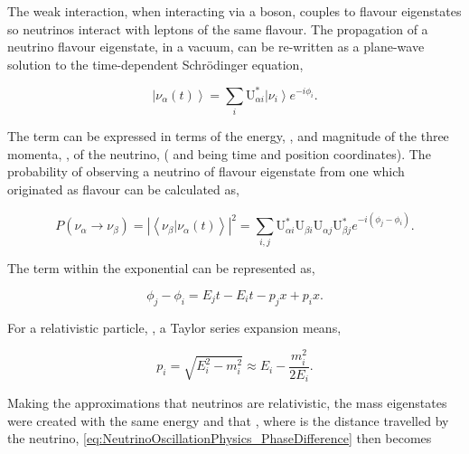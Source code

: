 The weak interaction, when interacting via a  boson, couples to flavour eigenstates so neutrinos interact with leptons of the same flavour. The propagation of a neutrino flavour eigenstate, in a vacuum, can be re-written as a plane-wave solution to the time-dependent Schr{\"o}dinger equation,

\begin{equation}
  \label{eq:NeutrinoOscillationPhysics_TimeDepSuperposition}
  \left|\nu_{\alpha}(t)\right> = \sum_{i}\mathrm{U}^{*}_{\alpha i}\left|\nu_{i}\right>e^{-i \phi_{i}}.
\end{equation}

The  term can be expressed in terms of the energy, , and magnitude of the three momenta, , of the neutrino,  ( and  being time and position coordinates). The probability of observing a neutrino of flavour eigenstate \quickmath{\beta} from one which originated as flavour \quickmath{\alpha} can be calculated as,

\begin{equation}
  \label{eq:NeutrinoOscillationPhysics_ProbabilityComplexForm}
  P(\nu_{\alpha} \rightarrow \nu_{\beta}) = \left| \left< \nu_{\beta} | \nu_{\alpha}(t) \right> \right|^{2} = \sum_{i,j} \mathrm{U}^{*}_{\alpha i}\mathrm{U}_{\beta i}\mathrm{U}_{\alpha j}\mathrm{U}^{*}_{\beta j} e^{-i(\phi_{j}-\phi_{i})}.
\end{equation}

The term within the exponential can be represented as,

\begin{equation}
  \label{eq:NeutrinoOscillationPhysics_PhaseDifference}
  \phi_{j}-\phi_{i} = E_{j}t - E_{i}t - p_{j}x + p_{i}x .
\end{equation}

For a relativistic particle, , a Taylor series expansion means,

\begin{equation}
  p_{i} = \sqrt{E^{2}_{i} - m^{2}_{i}} \approx E_{i} - \frac{m^{2}_{i}}{2E_{i}}.
\end{equation}

Making the approximations that neutrinos are relativistic, the mass eigenstates were created with the same energy and that , where  is the distance travelled by the neutrino, \autoref{eq:NeutrinoOscillationPhysics_PhaseDifference} then becomes

